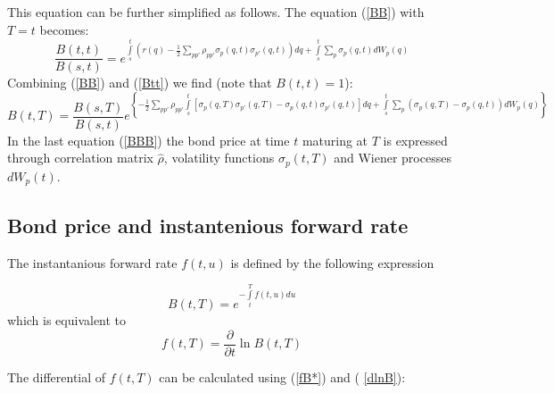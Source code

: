 \documentclass[10pt]{article}
\begin{document}
This equation can be further simplified as follows. The equation (\ref{BB}) with $T=t$ becomes:
\begin{equation}
\label{Btt}
 \frac{B(t,t)}{B(s,t)}= e^ {\int \limits_s^t \left ( r(q)  - \frac{1}{2}
\sum \limits_{pp'} \rho_{ pp'} \sigma_{p}(q,t) \sigma_{p'} (q,t) \right )  dq +
 \int \limits_s^t \sum \limits_p \sigma_{p}(q,t) dW_p(q) }
\end{equation}
Combining (\ref{BB}) and (\ref{Btt}) we find (note that $B(t,t)=1$):
\begin{equation}
\label{BBB}
 B(t,T) = \frac{B(s,T)}{B(s,t)} e^ {\left \{ - \frac{1}{2}
\sum \limits_{pp'} \rho_{ pp'} \int \limits_s^t  [ \sigma_{p}(q,T) \sigma_{p'} (q,T)  - \sigma_{p}(q,t) \sigma_{p'} (q,t) ]  dq +
 \int \limits_s^t \sum \limits_p (\sigma_{p}(q,T)- \sigma_{p}(q,t) ) dW_p(q) \right \}}
\end{equation}
In the last equation (\ref {BBB}) the bond price at time $t$ maturing at $T$ is expressed through correlation matrix $\hat {\rho}$, volatility functions $\sigma_p (t,T)$ and Wiener processes $dW_p(t)$.

\subsection{Bond price and instantenious forward rate}

The instantanious forward rate $f(t,u)$ is defined by the following expression

\begin{equation}
\label{Bef}
 B(t,T) = e^ { - \int \limits_t^T f(t,u) du }
\end{equation}
which is equivalent to 
\begin{equation}
\label{fB*}
 f(t,T) = \frac{\partial}{\partial t}   \ln B(t,T)
\end{equation}

The differential of $f(t,T)$ can be calculated using (\ref{fB*}) and ( \ref{dlnB}):
\end{document}

